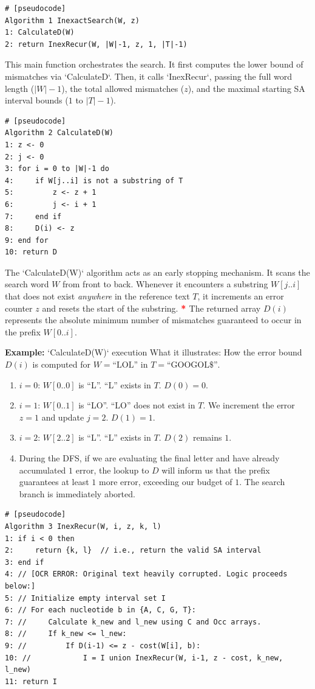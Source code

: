 \documentclass{article}
\newcommand{\sta}{\textbf{\textcolor{red}{* }}}
\begin{document}
\begin{verbatim}
# [pseudocode]
Algorithm 1 InexactSearch(W, z)
1: CalculateD(W)
2: return InexRecur(W, |W|-1, z, 1, |T|-1)
\end{verbatim}

This main function orchestrates the search. It first computes the lower bound of mismatches via `CalculateD`. Then, it calls `InexRecur`, passing the full word length ($|W|-1$), the total allowed mismatches ($z$), and the maximal starting SA interval bounds ($1$ to $|T|-1$).

\begin{verbatim}
# [pseudocode]
Algorithm 2 CalculateD(W)
1: z <- 0
2: j <- 0
3: for i = 0 to |W|-1 do
4:     if W[j..i] is not a substring of T
5:         z <- z + 1
6:         j <- i + 1
7:     end if
8:     D(i) <- z
9: end for
10: return D
\end{verbatim}

The `CalculateD(W)` algorithm acts as an early stopping mechanism. It scans the search word $W$ from front to back. Whenever it encounters a substring $W[j..i]$ that does not exist \textit{anywhere} in the reference text $T$, it increments an error counter $z$ and resets the start of the substring. \sta The returned array $D(i)$ represents the absolute minimum number of mismatches guaranteed to occur in the prefix $W[0..i]$.

\textbf{Example:} `CalculateD(W)` execution
What it illustrates: How the error bound $D(i)$ is computed for $W = \text{``LOL''}$ in $T = \text{``GOOGOL\$''}$.
\begin{enumerate}
    \item $i=0$: $W[0..0]$ is ``L''. ``L'' exists in $T$. $D(0) = 0$.
    \item $i=1$: $W[0..1]$ is ``LO''. ``LO'' does not exist in $T$. We increment the error $z=1$ and update $j=2$. $D(1) = 1$.
    \item $i=2$: $W[2..2]$ is ``L''. ``L'' exists in $T$. $D(2)$ remains $1$.
    \item During the DFS, if we are evaluating the final letter and have already accumulated $1$ error, the lookup to $D$ will inform us that the prefix guarantees at least $1$ more error, exceeding our budget of $1$. The search branch is immediately aborted.
\end{enumerate}

\begin{verbatim}
# [pseudocode]
Algorithm 3 InexRecur(W, i, z, k, l)
1: if i < 0 then
2:     return {k, l}  // i.e., return the valid SA interval
3: end if
4: // [OCR ERROR: Original text heavily corrupted. Logic proceeds below:]
5: // Initialize empty interval set I
6: // For each nucleotide b in {A, C, G, T}:
7: //     Calculate k_new and l_new using C and Occ arrays.
8: //     If k_new <= l_new:
9: //         If D(i-1) <= z - cost(W[i], b):
10: //            I = I union InexRecur(W, i-1, z - cost, k_new, l_new)
11: return I
\end{verbatim}
\end{document}
